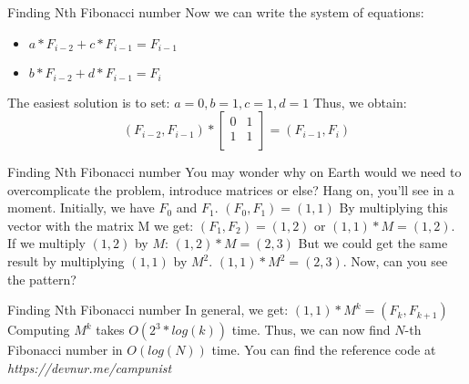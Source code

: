 \documentclass{beamer}
\begin{document}
\begin{frame}{Finding Nth Fibonacci number}
  Now we can write the system of equations:
  \begin{itemize}
    \item 
      $a * F_{i-2} + c * F_{i-1} = F_{i-1}$
    \item
      $b * F_{i-2} + d * F_{i-1} = F_i$
  \end{itemize}
  The easiest solution is to set:
  \newline
  $a = 0, b = 1, c = 1, d = 1$
  \newline
  Thus, we obtain:
  \[
    (F_{i-2}, F_{i-1})
    *
    \left[ {
      \begin{array}{cc}
        0 & 1 \\
        1 & 1 \\      
      \end{array} } 
    \right]
    = (F_{i-1}, F_i)
  \]
\end{frame}

\begin{frame}{Finding Nth Fibonacci number}
  You may wonder why on Earth would we need to overcomplicate the problem, introduce matrices or else?
  \newline Hang on, you'll see in a moment.
  \newline
  Initially, we have $F_0$ and $F_1$.
  \newline
  $(F_0, F_1) = (1, 1)$
  \newline
  By multiplying this vector with the matrix M we get:
  \newline
  $(F_1, F_2) = (1, 2)$ or $(1, 1) * M = (1, 2)$.
  \newline
  If we multiply $(1, 2)$ by $M$:
  \newline
  $(1, 2) * M = (2, 3)$
  \newline
  But we could get the same result by multiplying $(1, 1)$ by $M^2$.
  \newline
  $(1, 1) * M^2 = (2, 3)$.
  \newline Now, can you see the pattern?
\end{frame}

\begin{frame}{Finding Nth Fibonacci number}
  In general, we get:
  \newline
  $(1, 1) * M^k = (F_k, F_{k+1})$
  \newline
  Computing $M^k$ takes $O(2^3 * log(k))$ time. 
  \newline
  Thus, we can now find $N$-th Fibonacci number in $O(log(N))$ time.
  \newline \newline
  You can find the reference code at \textit{https://devnur.me/campunist}
\end{frame}
\end{document}
